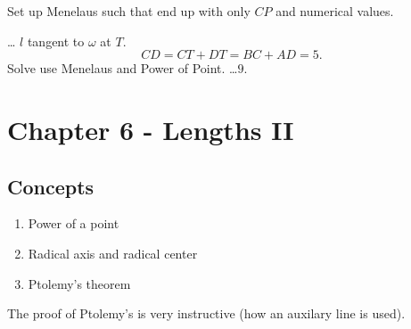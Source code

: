 \documentclass[11pt,twoside]{scrartcl}
\begin{document}
\begin{note}[Hint]
    Set up Menelaus such that end up with only $CP$ and numerical values.
\end{note}

\begin{soln}
    \TBD \ldots
    $l$ tangent to $\omega$ at $T$. 
    \[CD = CT + DT = BC + AD = 5.\]
    Solve use Menelaus and Power of Point. 
    \ldots $\boxed{9}$.
\end{soln}
\clearpage
\section{Chapter 6 - Lengths II}
\subsection{Concepts}
\begin{enumerate}
    \item Power of a point
    \item Radical axis and radical center
    \item Ptolemy's theorem
\end{enumerate}

\begin{remark}
    The proof of Ptolemy's is very instructive (how an auxilary line is used).
\end{remark}
\end{document}
